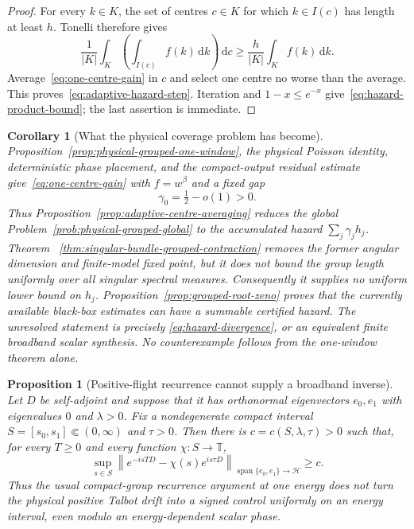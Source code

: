 \documentclass[11pt]{article}
\newtheorem{proposition}[theorem]{Proposition}
\newtheorem{corollary}[theorem]{Corollary}
\theoremstyle{remark}
\newcommand{\T}{\mathbb T}
\newcommand{\dd}{\,\mathrm d}
\begin{document}
\begin{proof}
For every $k\in K$, the set of centres $c\in K$ for which $k\in I(c)$ has
length at least $h$.  Tonelli therefore gives
\[
 \frac1{|K|}\int_K\!\left(\int_{I(c)}f(k)\dd k\right)\dd c
 \geq\frac{h}{|K|}\int_Kf(k)\dd k.
\]
Average~\eqref{eq:one-centre-gain} in $c$ and select one centre no worse
than the average.  This proves~\eqref{eq:adaptive-hazard-step}.  Iteration and
$1-x\leq e^{-x}$ give~\eqref{eq:hazard-product-bound}; the last assertion is
immediate.
\end{proof}

\begin{corollary}[What the physical coverage problem has become]
\label{cor:exact-hazard-bottleneck}
Proposition~\ref{prop:physical-grouped-one-window}, the physical Poisson
identity, deterministic phase placement, and the compact-output residual
estimate give~\eqref{eq:one-centre-gain} with $f=w^\beta$ and a fixed gap
\begin{equation}
 \gamma_0=\tfrac12-o(1)>0.
 \label{eq:fixed-grouped-window-gap}
\end{equation}
Thus Proposition~\ref{prop:adaptive-centre-averaging} reduces the global
Problem~\ref{prob:physical-grouped-global} to the accumulated hazard
$\sum_j\gamma_jh_j$.  Theorem
~\ref{thm:singular-bundle-grouped-contraction} removes the former angular
dimension and finite-model fixed point, but it does not bound the group length
uniformly over all singular spectral measures.  Consequently it supplies no
uniform lower bound on $h_j$.  Proposition~\ref{prop:grouped-root-zeno} proves
that the currently available black-box estimates can have a summable
certified hazard.  The unresolved statement is precisely
\eqref{eq:hazard-divergence}, or an equivalent finite broadband scalar
synthesis.  No counterexample follows from the one-window theorem alone.
\end{corollary}

\begin{proposition}[Positive-flight recurrence cannot supply a broadband inverse]
\label{prop:positive-flight-no-recurrence}
Let $D$ be self-adjoint and suppose that it has orthonormal eigenvectors
$e_0,e_1$ with eigenvalues $0$ and $\lambda>0$.  Fix a nondegenerate compact
interval $S=[s_0,s_1]\Subset(0,\infty)$ and $\tau>0$.  Then there is
$c=c(S,\lambda,\tau)>0$ such that, for every $T\geq0$ and every function
$\chi:S\to\T$,
\begin{equation}
 \sup_{s\in S}
 \left\|
  e^{-isTD}-\chi(s)e^{is\tau D}
 \right\|_{\operatorname{span}\{e_0,e_1\}\to\mathcal H}
 \geq c.
 \label{eq:no-uniform-positive-recurrence}
\end{equation}
Thus the usual compact-group recurrence argument at one energy does not turn
the physical positive Talbot drift into a signed control uniformly on an
energy interval, even modulo an energy-dependent scalar phase.
\end{proposition}
\end{document}
